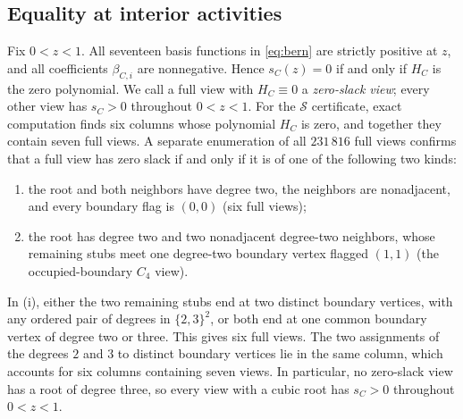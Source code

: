 \documentclass[11pt]{article}
\begin{document}
\subsection{Equality at interior activities}
Fix $0<z<1$. All seventeen basis functions in \eqref{eq:bern} are strictly positive at $z$, and all coefficients $\beta_{C,i}$ are nonnegative. Hence $s_C(z)=0$ if and only if $H_C$ is the zero polynomial. We call a full view with $H_C\equiv0$ a \emph{zero-slack view}; every other view has $s_C>0$ throughout $0<z<1$. For the $\mathcal S$ certificate, exact computation finds six columns whose polynomial $H_C$ is zero, and together they contain seven full views. A separate enumeration of all $231\,816$ full views confirms that a full view has zero slack if and only if it is of one of the following two kinds:
\begin{enumerate}[label=(\roman*),itemsep=2pt]
\item the root and both neighbors have degree two, the neighbors are nonadjacent, and every boundary flag is $(0,0)$ (six full views);
\item the root has degree two and two nonadjacent degree-two neighbors, whose remaining stubs meet one degree-two boundary vertex flagged $(1,1)$ (the occupied-boundary $C_4$ view).
\end{enumerate}
In (i), either the two remaining stubs end at two distinct boundary vertices, with any ordered pair of degrees in $\{2,3\}^2$, or both end at one common boundary vertex of degree two or three. This gives six full views. The two assignments of the degrees $2$ and $3$ to distinct boundary vertices lie in the same column, which accounts for six columns containing seven views. In particular, no zero-slack view has a root of degree three, so every view with a cubic root has $s_C>0$ throughout $0<z<1$.
\end{document}
